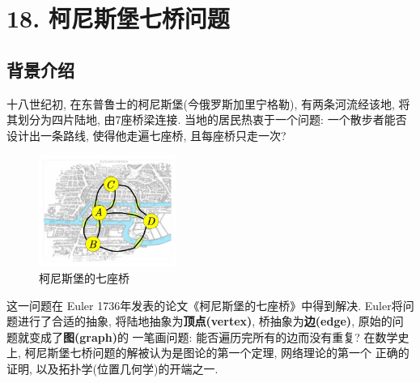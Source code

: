 \documentclass[main]{subfiles}
\begin{document}
\renewcommand{\filename}{subfile18}%
\section*{18. 柯尼斯堡七桥问题}
\subsection*{背景介绍}
十八世纪初, 在东普鲁士的柯尼斯堡(今俄罗斯加里宁格勒), 有两条河流经该地, 将其划分为四片陆地, 由7座桥梁连接. 
当地的居民热衷于一个问题: 一个散步者能否设计出一条路线, 使得他走遍七座桥, 且每座桥只走一次? \\
\begin{figure}[h]
 
  \centering
      \includegraphics[width=0.4\textwidth]{Konigsberg_bridges.pdf}
      \caption{柯尼斯堡的七座桥}
\end{figure}

这一问题在 Euler 1736年发表的论文《柯尼斯堡的七座桥》中得到解决. 
Euler将问题进行了合适的抽象, 将陆地抽象为\textbf{顶点(vertex)}, 桥抽象为\textbf{边(edge)}, 原始的问题就变成了\textbf{图(graph)}的
一笔画问题: 能否遍历完所有的边而没有重复? 在数学史上, 柯尼斯堡七桥问题的解被认为是图论的第一个定理, 网络理论的第一个
正确的证明, 以及拓扑学(位置几何学)的开端之一.
\end{document}
